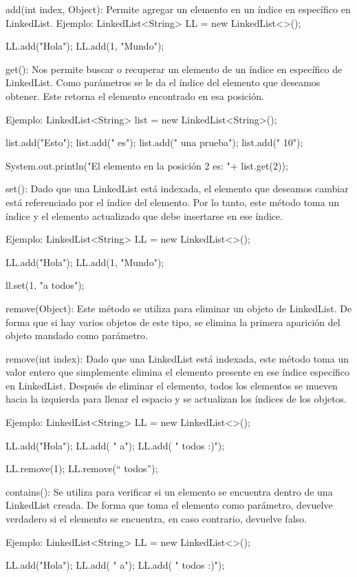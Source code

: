 \documentclass[12pt, letterpaper]{article} %
\begin{document}
add(int index, Object):
Permite agregar un elemento en un índice en específico en LinkedList.
Ejemplo:
LinkedList<String> LL = new LinkedList<>();

LL.add("Hola");  
LL.add(1, "Mundo");


get():
Nos permite buscar o recuperar un elemento de un índice en específico de LinkedList. Como parámetros se le da el índice del elemento que deseamos obtener. Este retorna el elemento encontrado en esa posición.

Ejemplo:
LinkedList<String> list = new LinkedList<String>();

list.add("Esto");
list.add(" es");
list.add(" una prueba");
list.add(" 10");

System.out.println("El elemento en la posición 2 es: "+ list.get(2));


set():
Dado que una LinkedList está indexada, el elemento que deseamos cambiar está referenciado por el índice del elemento. Por lo tanto, este método toma un índice y el elemento actualizado que debe insertarse en ese índice.

Ejemplo:
LinkedList<String> LL = new LinkedList<>();

LL.add("Hola");  
LL.add(1, "Mundo");

ll.set(1, "a todos");


remove(Object):
Este método se utiliza para eliminar un objeto de LinkedList. De forma que si hay varios objetos de este tipo, se elimina la primera aparición del objeto mandado como parámetro.

remove(int index):
Dado que una LinkedList está indexada, este método toma un valor entero que simplemente elimina el elemento presente en ese índice específico en LinkedList. Después de eliminar el elemento, todos los elementos se mueven hacia la izquierda para llenar el espacio y se actualizan los índices de los objetos.

Ejemplo:
LinkedList<String> LL = new LinkedList<>();

LL.add("Hola");  
LL.add( " a");
LL.add( " todos :)");

LL.remove(1);
LL.remove(“ todos”);


contains():
Se utiliza para verificar si un elemento se encuentra dentro de una LinkedList creada. De forma que toma el elemento como parámetro, devuelve verdadero si el elemento se encuentra, en caso contrario, devuelve falso.

Ejemplo:
LinkedList<String> LL = new LinkedList<>();

LL.add("Hola");  
LL.add( " a");
LL.add( " todos :)");
\end{document}
